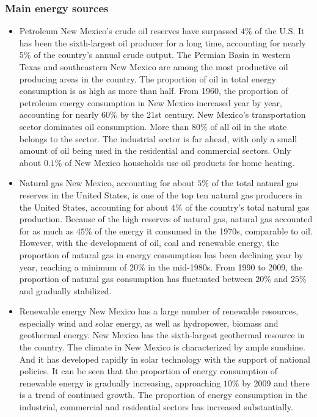 \documentclass{mcmthesis}
\begin{document}
\subsubsection{Main energy sources}
\begin{itemize}
  \item Petroleum
  New Mexico's crude oil reserves have surpassed $4\%$ of the U.S. It has been the sixth-largest oil producer for a long time, accounting
  for nearly $5\%$ of the country's annual crude output. The Permian Basin in western Texas and southeastern New Mexico are among
  the most productive oil producing areas in the country. The proportion of oil in total energy consumption is as high as more than half.
  From 1960, the proportion of petroleum energy consumption in New Mexico increased year by year, accounting for nearly $60\%$ by the 21st century.
  New Mexico's transportation sector dominates oil consumption. More than $80\%$ of all oil in the state belongs to the sector.
  The industrial sector is far ahead, with only a small amount of oil being used in the residential and commercial sectors.
  Only about $0.1\%$ of New Mexico households use oil products for home heating.
  \item Natural gas
  New Mexico, accounting for about $5\%$ of the total natural gas reserves in the United States, is one of the top ten natural gas
  producers in the United States, accounting for about $4\%$ of the country's total natural gas production. Because of the high reserves of
  natural gas, natural gas accounted for as much as $45\%$ of the energy it consumed in the 1970s, comparable to oil.
  However, with the development of oil, coal and renewable energy, the proportion of natural gas in energy consumption has been declining year by year,
  reaching a minimum of $20\%$ in the mid-1980s. From 1990 to 2009, the proportion of natural gas consumption has fluctuated between $20\%$ and $25\%$
   and gradually stabilized.
  \item Renewable energy
  New Mexico has a large number of renewable resources, especially wind and solar energy, as well as hydropower, biomass and geothermal energy.
  New Mexico has the sixth-largest geothermal resource in the country. The climate in New Mexico is characterized by ample sunshine.
  And it has developed rapidly in solar technology with the support of national policies. It can be seen that the proportion of energy
  consumption of renewable energy is gradually increasing, approaching $10\%$ by 2009 and there is a trend of continued growth.
  The proportion of energy consumption in the industrial, commercial and residential sectors has increased substantially.

\end{itemize}
\end{document}
